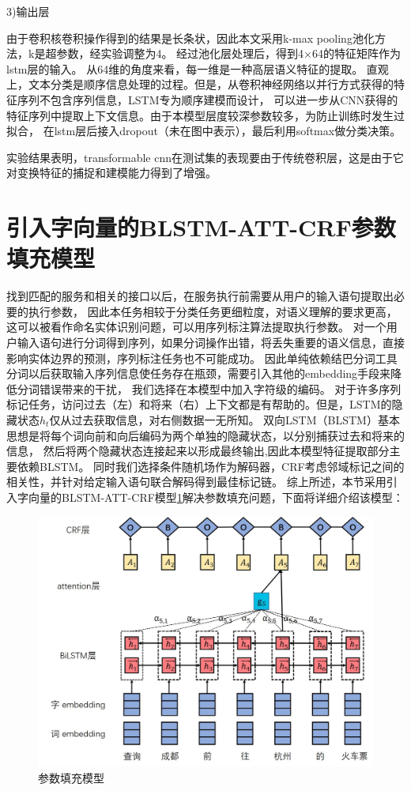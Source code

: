 3)输出层

由于卷积核卷积操作得到的结果是长条状，因此本文采用k-max pooling池化方法，k是超参数，经实验调整为4。
经过池化层处理后，得到4×64的特征矩阵作为lstm层的输入。
从64维的角度来看，每一维是一种高层语义特征的提取。
直观上，文本分类是顺序信息处理的过程。但是，从卷积神经网络以并行方式获得的特征序列不包含序列信息，LSTM专为顺序建模而设计，
可以进一步从CNN获得的特征序列中提取上下文信息。由于本模型层度较深参数较多，为防止训练时发生过拟合，
在lstm层后接入dropout（未在图中表示），最后利用softmax做分类决策。

实验结果表明，transformable cnn在测试集的表现要由于传统卷积层，这是由于它对变换特征的捕捉和建模能力得到了增强。
\section{引入字向量的BLSTM-ATT-CRF参数填充模型}
找到匹配的服务和相关的接口以后，在服务执行前需要从用户的输入语句提取出必要的执行参数，
因此本任务相较于分类任务更细粒度，对语义理解的要求更高，
这可以被看作命名实体识别问题，可以用序列标注算法提取执行参数。
对一个用户输入语句进行分词得到序列，如果分词操作出错，将丢失重要的语义信息，直接影响实体边界的预测，序列标注任务也不可能成功。
因此单纯依赖结巴分词工具分词以后获取输入序列信息使任务存在瓶颈，需要引入其他的embedding手段来降低分词错误带来的干扰，
我们选择在本模型中加入字符级的编码。
对于许多序列标记任务，访问过去（左）和将来（右）上下文都是有帮助的。但是，LSTM的隐藏状态$h_t$仅从过去获取信息，对右侧数据一无所知。 
双向LSTM（BLSTM）基本思想是将每个词向前和向后编码为两个单独的隐藏状态，以分别捕获过去和将来的信息，
然后将两个隐藏状态连接起来以形成最终输出,因此本模型特征提取部分主要依赖BLSTM。
同时我们选择条件随机场作为解码器，CRF考虑邻域标记之间的相关性，并针对给定输入语句联合解码得到最佳标记链。
综上所述，本节采用引入字向量的BLSTM-ATT-CRF模型\ref{fig:blstm-att-crf}解决参数填充问题，下面将详细介绍该模型：

\begin{figure}[htbp]
  \centering
  \includegraphics[scale=0.5]{./images/blstm-att-crf.jpg}
  \caption{参数填充模型}
  \label{fig:blstm-att-crf}
\end{figure}

